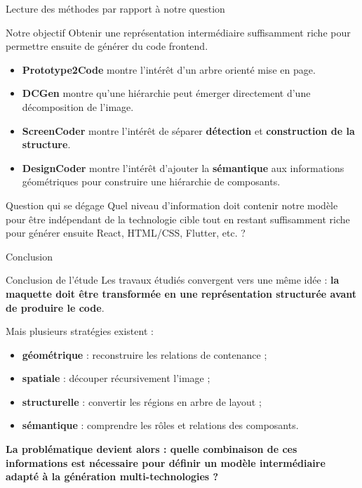 \documentclass[aspectratio=169,11pt]{beamer}
\newcommand{\method}[1]{\textbf{#1}}
\begin{document}
\begin{frame}{Lecture des méthodes par rapport à notre question}
\begin{block}{Notre objectif}
Obtenir une représentation intermédiaire suffisamment riche pour
permettre ensuite de générer du code frontend.
\end{block}

\vspace{0.2cm}
\begin{itemize}
  \item \method{Prototype2Code} montre l'intérêt d'un arbre orienté mise en page.
  \item \method{DCGen} montre qu'une hiérarchie peut émerger directement d'une décomposition de l'image.
  \item \method{ScreenCoder} montre l'intérêt de séparer \textbf{détection} et \textbf{construction de la structure}.
  \item \method{DesignCoder} montre l'intérêt d'ajouter la \textbf{sémantique} aux informations géométriques pour construire une hiérarchie de composants.
\end{itemize}

\begin{alertblock}{Question qui se dégage}
Quel niveau d'information doit contenir notre modèle pour être
indépendant de la technologie cible tout en restant suffisamment riche
pour générer ensuite React, HTML/CSS, Flutter, etc. ?
\end{alertblock}
\end{frame}

\begin{frame}{Conclusion}
\begin{block}{Conclusion de l'étude}
Les travaux étudiés convergent vers une même idée :
\textbf{la maquette doit être transformée en une représentation structurée
avant de produire le code}.
\end{block}

\vspace{0.25cm}
Mais plusieurs stratégies existent :
\begin{itemize}
  \item \textbf{géométrique} : reconstruire les relations de contenance ;
  \item \textbf{spatiale} : découper récursivement l'image ;
  \item \textbf{structurelle} : convertir les régions en arbre de layout ;
  \item \textbf{sémantique} : comprendre les rôles et relations des composants.
\end{itemize}

\vspace{0.2cm}
\centering
\textbf{La problématique devient alors : quelle combinaison de ces informations
est nécessaire pour définir un modèle intermédiaire adapté à la génération
multi-technologies ?}
\end{frame}
\end{document}
